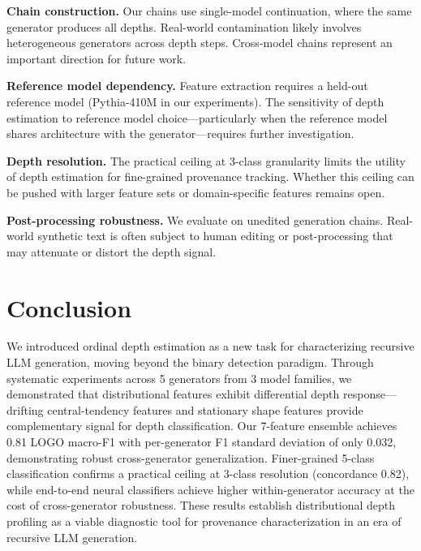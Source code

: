 \documentclass[11pt,a4paper]{article}
\begin{document}
\textbf{Chain construction.} Our chains use single-model continuation, where the same generator produces all depths. Real-world contamination likely involves heterogeneous generators across depth steps. Cross-model chains represent an important direction for future work.

\textbf{Reference model dependency.} Feature extraction requires a held-out reference model (Pythia-410M in our experiments). The sensitivity of depth estimation to reference model choice---particularly when the reference model shares architecture with the generator---requires further investigation.

\textbf{Depth resolution.} The practical ceiling at 3-class granularity limits the utility of depth estimation for fine-grained provenance tracking. Whether this ceiling can be pushed with larger feature sets or domain-specific features remains open.

\textbf{Post-processing robustness.} We evaluate on unedited generation chains. Real-world synthetic text is often subject to human editing or post-processing that may attenuate or distort the depth signal.

\section{Conclusion}

We introduced ordinal depth estimation as a new task for characterizing recursive LLM generation, moving beyond the binary detection paradigm. Through systematic experiments across 5 generators from 3 model families, we demonstrated that distributional features exhibit differential depth response---drifting central-tendency features and stationary shape features provide complementary signal for depth classification. Our 7-feature ensemble achieves 0.81 LOGO macro-F1 with per-generator F1 standard deviation of only 0.032, demonstrating robust cross-generator generalization. Finer-grained 5-class classification confirms a practical ceiling at 3-class resolution (concordance 0.82), while end-to-end neural classifiers achieve higher within-generator accuracy at the cost of cross-generator robustness. These results establish distributional depth profiling as a viable diagnostic tool for provenance characterization in an era of recursive LLM generation.


\end{document}
